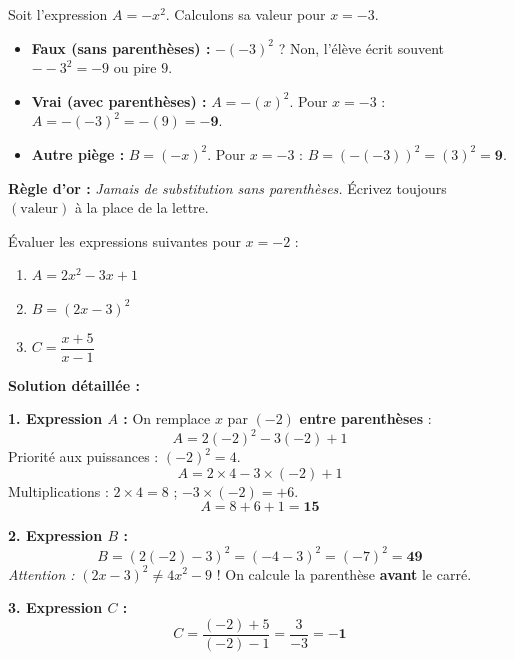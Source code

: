 \documentclass[11pt]{article}
\begin{document}
\begin{attention}
Soit l'expression $A = -x^2$. Calculons sa valeur pour $x = -3$.
\begin{itemize}
 \item \textbf{Faux (sans parenthèses) :} $-(-3)^2$ ? Non, l'élève écrit souvent $- -3^2 = -9$ ou pire $9$.
 \item \textbf{Vrai (avec parenthèses) :} $A = -(x)^2$. Pour $x=-3$ : $A = -(-3)^2 = -(9) = \mathbf{-9}$.
 \item \textbf{Autre piège :} $B = (-x)^2$. Pour $x=-3$ : $B = (-(-3))^2 = (3)^2 = \mathbf{9}$.
\end{itemize}
\textbf{Règle d'or :} \emph{Jamais de substitution sans parenthèses.} Écrivez toujours $(\text{valeur})$ à la place de la lettre.
\end{attention}

\begin{exoresolu}
Évaluer les expressions suivantes pour $x = -2$ :
\begin{enumerate}
 \item $A = 2x^2 - 3x + 1$
 \item $B = (2x - 3)^2$
 \item $C = \dfrac{x+5}{x-1}$
\end{enumerate}

\tcblower
\textbf{Solution détaillée :}

\textbf{1. Expression $A$ :}
On remplace $x$ par $(-2)$ \textbf{entre parenthèses} :
\[ A = 2(-2)^2 - 3(-2) + 1 \]
Priorité aux puissances : $(-2)^2 = 4$.
\[ A = 2 \times 4 - 3 \times (-2) + 1 \]
Multiplications : $2 \times 4 = 8$ ; $-3 \times (-2) = +6$.
\[ A = 8 + 6 + 1 = \mathbf{15} \]

\textbf{2. Expression $B$ :}
\[ B = (2(-2) - 3)^2 = (-4 - 3)^2 = (-7)^2 = \mathbf{49} \]
\emph{Attention :} $(2x-3)^2 \neq 4x^2 - 9$ ! On calcule la parenthèse \textbf{avant} le carré.

\textbf{3. Expression $C$ :}
\[ C = \dfrac{(-2)+5}{(-2)-1} = \dfrac{3}{-3} = \mathbf{-1} \]
\end{exoresolu}
\end{document}
